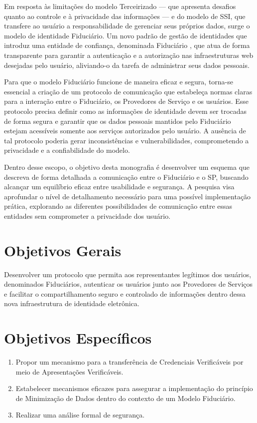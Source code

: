 Em resposta às limitações do modelo Terceirizado — que apresenta desafios quanto ao controle e à privacidade das informações — e do modelo de \acs{SSI}, que transfere ao usuário a responsabilidade de gerenciar seus próprios dados, surge o modelo de identidade Fiduciário. Um novo padrão de gestão de identidades que introduz uma entidade de confiança, denominada Fiduciário \cite{fiduciary}, que atua de forma transparente para garantir a autenticação e a autorização nas infraestruturas web desejadas pelo usuário, aliviando-o da tarefa de administrar seus dados pessoais.

Para que o modelo Fiduciário funcione de maneira eficaz e segura, torna-se essencial a criação de um protocolo de comunicação que estabeleça normas claras para a interação entre o Fiduciário, os Provedores de Serviço e os usuários. Esse protocolo precisa definir como as informações de identidade devem ser trocadas de forma segura e garantir que os dados pessoais mantidos pelo Fiduciário estejam acessíveis somente aos serviços autorizados pelo usuário. A ausência de tal protocolo poderia gerar inconsistências e vulnerabilidades, comprometendo a privacidade e a confiabilidade do modelo.

Dentro desse escopo, o objetivo desta monografia é desenvolver um esquema que descreva de forma detalhada a comunicação entre o Fiduciário e o \acs{SP}, buscando alcançar um equilíbrio eficaz entre usabilidade e segurança. A pesquisa visa aprofundar o nível de detalhamento necessário para uma possível implementação prática, explorando as diferentes possibilidades de comunicação entre essas entidades sem comprometer a privacidade dos usuário.

\section{Objetivos Gerais}\label{section:objetivos-gerais}
Desenvolver um protocolo que permita aos representantes legítimos dos usuários, denominados Fiduciários, autenticar os usuários junto aos Provedores de Serviços e facilitar o compartilhamento seguro e controlado de informações dentro dessa nova infraestrutura de identidade eletrônica.

\section{Objetivos Específicos}\label{section:objetivos-especificos}

\begin{enumerate}[label=\textbf{\roman*.}]

    \item Propor um mecanismo para a transferência de Credenciais Verificáveis por meio de Apresentações Verificáveis.
    
    \item Estabelecer mecanismos eficazes para assegurar a implementação do princípio de Minimização de Dados dentro do contexto de um Modelo Fiduciário.

    \item Realizar uma análise formal de segurança.

\end{enumerate}

